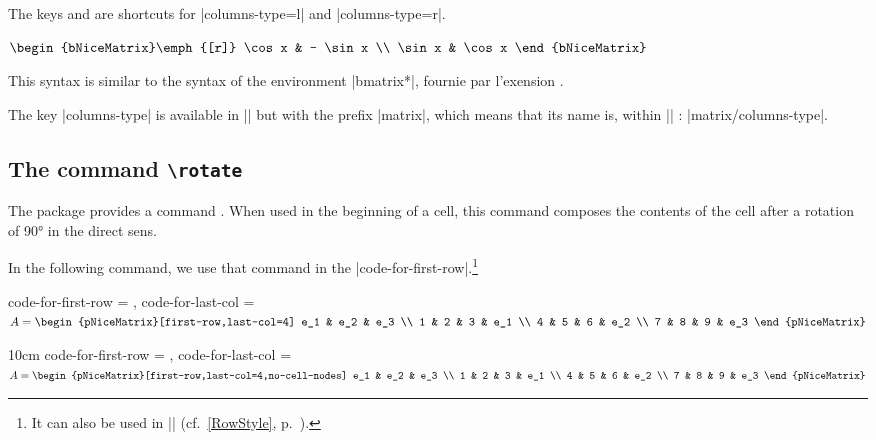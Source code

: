 \documentclass[dvipsnames]{article}
\begin{document}
The keys  and  are shortcuts for |columns-type=l|
and |columns-type=r|. 


\medskip
\begin{Code}[width=10cm,show-output,no-cell-nodes]
$\begin{bNiceMatrix}\emph{[r]}
  \cos x & - \sin x \\
  \sin x & \cos x 
\end{bNiceMatrix}$
\end{Code}

\medskip
This syntax is similar to the syntax of the environment |{bmatrix*}|, fournie par
l'exension .

\medskip
The key |columns-type| is available in |\NiceMatrixOptions| but with the
prefix |matrix|, which means that its name is, within |\NiceMatrixOptions| :
|matrix/columns-type|. 

\subsection{The command \texttt{\textbackslash rotate}}

\label{rotate}

The package  provides a command . When
used in the beginning of a cell, this command composes the contents of the cell
after a rotation of 90° in the direct sens.

In the following command, we use that command in the
|code-for-first-row|.\footnote{It can also be used in |\RowStyle|
(cf.~\ref{RowStyle}, p.~\pageref{RowStyle}).} 

\bigskip

\begin{Code}[width=12cm]
\NiceMatrixOptions
 {
   code-for-first-row = \scriptstyle \emph{\rotate} ,
   code-for-last-col = \scriptstyle
 }
$A = \begin{pNiceMatrix}[first-row,last-col=4]
  e_1 & e_2 & e_3       \\
  1   & 2   & 3   & e_1 \\
  4   & 5   & 6   & e_2 \\
  7   & 8   & 9   & e_3 
\end{pNiceMatrix}$
\end{Code}
\begin{varwidth}{10cm}
\NiceMatrixOptions
  {
    code-for-first-row = \scriptstyle\rotate {},
    code-for-last-col = \scriptstyle
  }
$ A = \begin{pNiceMatrix}[first-row,last-col=4,no-cell-nodes]
e_1 & e_2 & e_3 \\
1   & 2   & 3  & e_1 \\
4   & 5   & 6  & e_2 \\
7   & 8   & 9  & e_3 
\end{pNiceMatrix}$
\end{varwidth}
\end{document}
